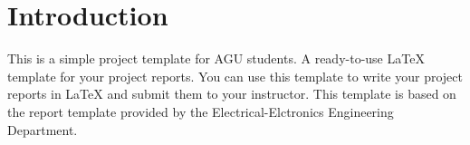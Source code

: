 \chapter{Introduction}

This is a simple project template for AGU students. A ready-to-use \LaTeX{} template for your project reports. You can use this template to write your project reports in \LaTeX{} and submit them to your instructor. This template is based on the report template provided by the Electrical-Elctronics Engineering Department.
